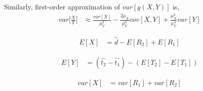 \documentclass[10pt,twocolumn,letterpaper]{article}
\newcommand{\ignore}[1]{}
\begin{document}
Similarly, first-order approximation of  \(var[g(X,Y)]\) is,
\begin{equation}
\begin{split}
   var\bigg[\frac{X}{Y}\bigg] &\approx \frac{var[X]}{\mu_Y^2} - \frac{2\mu_X}{\mu_Y^3}cov[X,Y] + \frac{\mu_X^2}{\mu_Y^4}var[Y]
\end{split}
\end{equation}



\begin{equation}
\begin{split}
   E[X] &= \ignore{E[\hat{d} - R_2 + R_1] \\ &= E[\hat{d} + (-R_2) + R_1] \\ &= E[\hat{d}] + E[-R_2] + E[R_1] \\ &= E[\hat{d}] - E[R_2] + E[R_1]} \hat{d} - E[R_2] + E[R_1]
\end{split}
\end{equation}


\begin{equation}
\begin{split}
   E[Y] &= \ignore{E[ (\hat{t_2} - T_2 ) - (\hat{t_1} - T_1 ) ] \\ &= E[\hat{t_2} + (-T_2) + (-\hat{t_1}) + T_1 )] \\ &= E[\hat{t_2}] + E[-T_2] + E[-\hat{t_1}] + E[T_1] \\ &= E[\hat{t_2}] - E[T_2] - E[\hat{t_1}] + E[T_1] \\ &= \hat{t_2} - E[T_2] - \hat{t_1} + E[T_1] \\ &=} ( \hat{t_2} - \hat{t_1} ) - ( E[T_2] - E[T_1] )
\end{split}
\end{equation}

\begin{equation}
\begin{split}
   var[X] &= \ignore{var[\hat{d} - R_2 + R_1] \\ &= var[\hat{d} + (-R_2) + R_1] \\ &= var[\hat{d}] + var[-R_2] + var[R_1] \\ &= var[\hat{d}] + var[R_2] + var[R_1] \\ &=} var[R_1] + var[R_2]
\end{split}
\end{equation}
\end{document}
